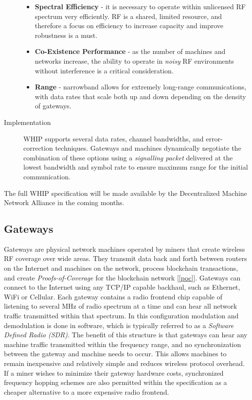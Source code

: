 \documentclass[10pt, nonatbib, nocopyrightspace, reprint]{sigplanconf}
\newcommand{\secref}[1]{[\autoref{#1}]}
\begin{document}
\begin{description}
    \begin{itemize}
        \item \textbf{Spectral Efficiency} - it is necessary to operate within unlicensed RF spectrum very efficiently. RF is a shared, limited resource, and therefore a focus on efficiency to increase capacity and improve robustness is a must.
        \item \textbf{Co-Existence Performance} - as the number of machines and networks increase, the ability to operate in \emph{noisy} RF environments without interference is a critical consideration.
        \item \textbf{Range} - narrowband allows for extremely long-range communications, with data rates that scale both up and down depending on the density of gateways.
    \end{itemize}

    \item [Implementation] WHIP supports several data rates, channel bandwidths, and error-correction techniques. Gateways and machines dynamically negotiate the combination of these options using a \emph{signalling packet} delivered at the lowest bandwidth and symbol rate to ensure maximum range for the initial communication.
\end{description}

The full WHIP specification will be made available by the Decentralized Machine Network Alliance in the coming months.

\subsection{Gateways}\label{gateways}

Gateways are physical network machines operated by miners that create wireless RF coverage over wide areas. They transmit data back and forth between routers on the Internet and machines on the network, process blockchain transactions, and create \emph{Proofs-of-Coverage} for the blockchain network \secref{poc}. Gateways can connect to the Internet using any TCP/IP capable backhaul, such as Ethernet, WiFi or Cellular. Each gateway contains a radio frontend chip capable of listening to several MHz of radio spectrum at a time and can hear all network traffic transmitted within that spectrum. In this configuration modulation and demodulation is done in software, which is typically referred to as a \emph{Software Defined Radio (SDR)}. The benefit of this structure is that gateways can hear any machine traffic transmitted within the frequency range, and no synchronization between the gateway and machine needs to occur. This allows machines to remain inexpensive and relatively simple and reduces wireless protocol overhead. If a miner wishes to minimize their gateway hardware costs, synchronized frequency hopping schemes are also permitted within the specification as a cheaper alternative to a more expensive radio frontend.
\end{document}
